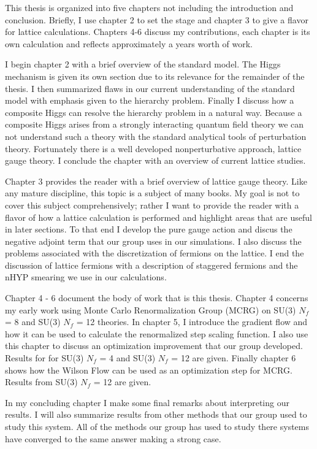 This thesis is organized into five chapters not including the introduction and conclusion.
Briefly, I use chapter 2 to set the stage and chapter 3 to give a flavor for lattice calculations.
Chapters 4-6 discuss my contributions, each chapter is its own calculation and reflects approximately a years worth of work.

I begin chapter 2 with a brief overview of the standard model.
The Higgs mechanism is given its own section due to its relevance for the remainder of the thesis.
I then summarized flaws in our current understanding of the standard model with emphasis given to the hierarchy problem.
Finally I discuss how a composite Higgs can resolve the hierarchy problem in a natural way.
Because a composite Higgs arises from a strongly interacting quantum field theory we can not understand such a theory with the standard analytical tools of perturbation theory.
Fortunately there is a well developed nonperturbative approach, lattice gauge theory.
I conclude the chapter with an overview of current lattice studies.

Chapter 3 provides the reader with a brief overview of lattice gauge theory.
Like any mature discipline, this topic is a subject of many books.
My goal is not to cover this subject comprehensively; rather I want to provide the reader with a flavor of how a lattice calculation is performed and highlight areas that are useful in later sections.
To that end I develop the pure gauge action and discus the negative adjoint term that our group uses in our simulations.
I also discuss the problems associated with the discretization of fermions on the lattice.
I end the discussion of lattice fermions with a description of staggered fermions and the nHYP smearing we use in our calculations.

Chapter 4 - 6 document the body of work that is this thesis.
Chapter 4 concerns my early work using Monte Carlo Renormalization Group (MCRG) on SU(3) $N_f$ = 8 and SU(3) $N_f$ = 12 theories.
In chapter 5, I introduce the gradient flow and how it can be used to calculate the renormalized step scaling function.
I also use this chapter to discuss an optimization improvement that our group developed.
Results for for SU(3) $N_f$ = 4 and SU(3) $N_f$ = 12 are given.
Finally chapter 6 shows how the Wilson Flow can be used as an optimization step for MCRG.
Results from SU(3) $N_f$ = 12 are given.

In my concluding chapter I make some final remarks about interpreting our results.
I will also summarize results from other methods that our group used to study this system.
All of the methods our group has used to study there systems have converged to the same answer making a strong case.
